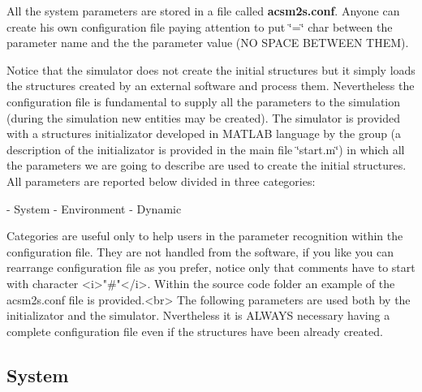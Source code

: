  All the system parameters are stored in a file called {\bfseries acsm2s.\-conf}. Anyone can create his own configuration file paying attention to put \char`\"{}=\char`\"{} char between the parameter name and the the parameter value (N\-O S\-P\-A\-C\-E B\-E\-T\-W\-E\-E\-N T\-H\-E\-M).\par
 Notice that the simulator does not create the initial structures but it simply loads the structures created by an external software and process them. Nevertheless the configuration file is fundamental to supply all the parameters to the simulation (during the simulation new entities may be created). The simulator is provided with a structures initializator developed in M\-A\-T\-L\-A\-B language by the group (a description of the initializator is provided in the main file \char`\"{}start.\-m\char`\"{}) in which all the parameters we are going to describe are used to create the initial structures. All parameters are reported below divided in three categories\-: \begin{DoxyVerb}          - System
          - Environment
          - Dynamic

          Categories are useful only to help users in the parameter recognition within the configuration file. They are not handled from the software, if you like you can rearrange configuration file as you prefer, notice only that comments have to start with character <i>"#"</i>. Within the source code folder an example of the acsm2s.conf file is provided.<br>
 The following parameters are used both by the initializator and the simulator. Nvertheless it is ALWAYS necessary having a complete configuration file even if the structures have been already created.
\end{DoxyVerb}
 \hypertarget{intro_paramsystem}{}\subsection{System}\label{intro_paramsystem}


